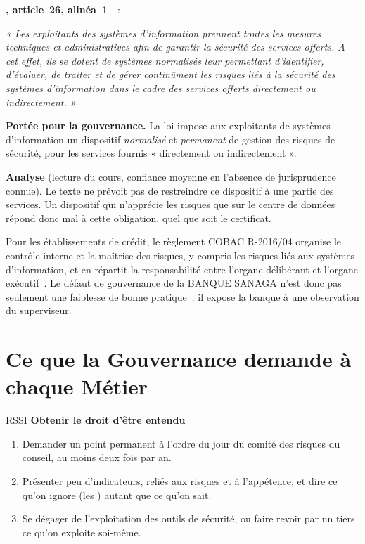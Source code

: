 \begin{boxjuris}
\textbf{, article~26, alinéa~1}~\cite{loi2010012}~:

\medskip
\textit{« Les exploitants des systèmes d'information prennent toutes les
mesures techniques et administratives afin de garantir la sécurité des
services offerts. A cet effet, ils se dotent de systèmes normalisés leur
permettant d'identifier, d'évaluer, de traiter et de gérer continûment les
risques liés à la sécurité des systèmes d'information dans le cadre des
services offerts directement ou indirectement. »}

\medskip
\textbf{Portée pour la gouvernance.} La loi impose aux exploitants de
systèmes d'information un dispositif \emph{normalisé} et \emph{permanent}
de gestion des risques de sécurité, pour les services fournis
« directement ou indirectement ».

\medskip
\textbf{Analyse} (lecture du cours, confiance moyenne en l'absence de
jurisprudence connue). Le texte ne prévoit pas de restreindre ce
dispositif à une partie des services. Un dispositif qui n'apprécie les
risques que sur le centre de données répond donc mal à cette obligation,
quel que soit le certificat.
\end{boxjuris}

Pour les établissements de crédit, le règlement COBAC R-2016/04 organise
le contrôle interne et la maîtrise des risques, y compris les risques liés
aux systèmes d'information, et en répartit la responsabilité entre
l'organe délibérant et l'organe exécutif~\cite{cobac2016r04}. Le défaut de
gouvernance de la BANQUE SANAGA n'est donc pas seulement une faiblesse de
bonne pratique~: il expose la banque à une observation du superviseur.

\section{Ce que la Gouvernance demande à chaque Métier}
\label{sec:c01-metiers}

\begin{boxmetier}{RSSI}
\textbf{Obtenir le droit d'être entendu}
\begin{enumerate}
    \item Demander un point permanent à l'ordre du jour du comité des
          risques du conseil, au moins deux fois par an.
    \item Présenter peu d'indicateurs, reliés aux risques et à l'appétence,
          et dire ce qu'on ignore (les \NEK{}) autant que ce qu'on sait.
    \item Se dégager de l'exploitation des outils de sécurité, ou faire
          revoir par un tiers ce qu'on exploite soi-même.
\end{enumerate}
\end{boxmetier}

